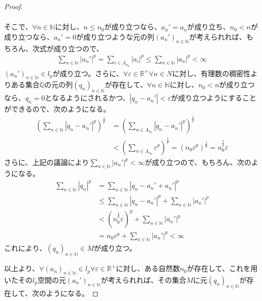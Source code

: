 \documentclass[dvipdfmx]{jsarticle}
\begin{document}
\begin{proof}
\begin{align*}
\end{align*}\par
そこで、$\forall n \in \mathbb{N}$に対し、$n \leq n_{0}$が成り立つなら、$a_{n}' = a_{n}$が成り立ち、$n_{0} < n$が成り立つなら、$a_{n}' = 0$が成り立つような元の列$\left( a_{n}' \right)_{n \in \mathbb{N}}$が考えられれば、もちろん、次式が成り立つので、
\begin{align*}
\sum_{n \in \mathbb{N}} \left| a_{n}' \right|^{p} = \sum_{i \in \varLambda_{n_{0}}} \left| a_{i} \right|^{p} \leq \sum_{n \in \mathbb{N}} \left| a_{n} \right|^{p} < \infty
\end{align*}
$\left( a_{n}' \right)_{n \in \mathbb{N}} \in l_{p}$が成り立つ。さらに、$\forall\varepsilon \in \mathbb{R}^{+}\forall n \in N$に対し、有理数の稠密性よりある集合$\mathbb{Q}$の元の列$\left( q_{n} \right)_{n \in \mathbb{N}}$が存在して、$\forall n \in \mathbb{N}$に対し、$n_{0} < n$が成り立つなら、$q_{n} = 0$となるようにされるかつ、$\left| q_{n} - a_{n}' \right| < \varepsilon$が成り立つようにすることができるので、次のようになる。
\begin{align*}
\left( \sum_{n \in \mathbb{N}} \left| q_{n} - a_{n}' \right|^{p} \right)^{\frac{1}{p}} &= \left( \sum_{n \in \varLambda_{n_{0}}} \left| q_{n} - a_{n}' \right|^{p} \right)^{\frac{1}{p}}\\
&< \left( \sum_{n \in \varLambda_{n_{0}}} \varepsilon^{p} \right)^{\frac{1}{p}} = \left( n_{0}\varepsilon^{p} \right)^{\frac{1}{p}} = n_{0}^{\frac{1}{p}}\varepsilon
\end{align*}
さらに、上記の議論により$\sum_{n \in \mathbb{N}} \left| a_{n}' \right|^{p} < \infty$が成り立つので、もちろん、次のようになる。
\begin{align*}
\sum_{n \in \mathbb{N}} \left| q_{n} \right|^{p} &= \sum_{n \in \mathbb{N}} \left| q_{n} - a_{n}' + a_{n}' \right|^{p}\\
&\leq \sum_{n \in \mathbb{N}} \left| q_{n} - a_{n}' \right|^{p} + \sum_{n \in \mathbb{N}} \left| a_{n}' \right|^{p}\\
&< \left( n_{0}^{\frac{1}{p}}\varepsilon \right)^{p} + \sum_{n \in \mathbb{N}} \left| a_{n}' \right|^{p}\\
&= n_{0}\varepsilon^{p} + \sum_{n \in \mathbb{N}} \left| a_{n}' \right|^{p} < \infty
\end{align*}
これにより、$\left( q_{n} \right)_{n \in \mathbb{N}} \in M$が成り立つ。\par
以上より、$\forall\left( a_{n} \right)_{n \in \mathbb{N}} \in l_{p}\forall\varepsilon \in \mathbb{R}^{+}$に対し、ある自然数$n_{0}$が存在して、これを用いたその$l_{p}$空間の元$\left( a_{n}' \right)_{n \in \mathbb{N}}$が考えられれば、その集合$M$に元$\left( q_{n} \right)_{n \in \mathbb{N}}$が存在して、次のようになる。

\end{proof}
\end{document}
